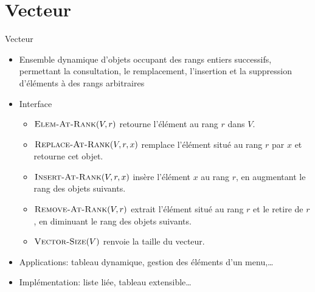 \section{Vecteur}

\begin{frame}{Vecteur}

\begin{itemize}
\item Ensemble dynamique d'objets occupant des rangs entiers
  successifs, permettant la consultation, le remplacement, l'insertion
  et la suppression d'éléments à des rangs arbitraires
\item Interface
\begin{itemize}
\item $\textnormal{\scshape Elem-At-Rank}(V,r)$ retourne l'élément au rang $r$ dans $V$.
\item $\textnormal{\scshape Replace-At-Rank}(V,r,x)$ remplace l'élément situé au rang $r$ par $x$ et retourne cet objet. 
\item $\textnormal{\scshape Insert-At-Rank}(V,r,x)$ insère l'élément $x$ au rang $r$, en augmentant le rang des objets suivants.
\item $\textnormal{\scshape Remove-At-Rank}(V,r)$ extrait l'élément situé au rang $r$ et le retire de $r$, en diminuant le rang des objets suivants.
\item $\textnormal{\scshape Vector-Size}(V)$ renvoie la taille du vecteur.
\end{itemize}
\item Applications: tableau dynamique, gestion des éléments d'un menu,\ldots
\item Implémentation: liste liée, tableau extensible\ldots
\end{itemize}

\end{frame}

